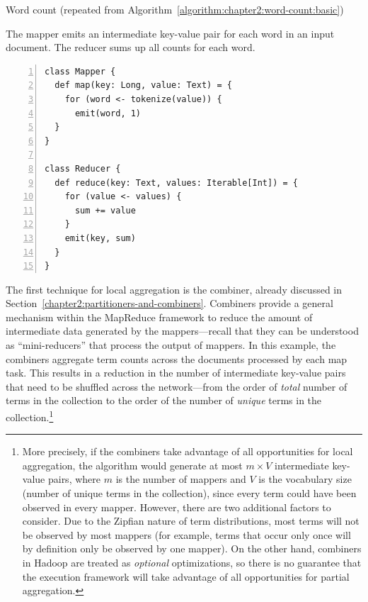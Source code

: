 \documentclass[11pt]{article}
\begin{document}
\begin{algorithm}[t]
\caption{Word count (repeated from Algorithm~\ref{algorithm:chapter2:word-count:basic})}
\label{algorithm:chapter3:word-count:basic}
The mapper emits an intermediate key-value pair for each word in an
input document. The reducer sums up all counts for each word.
\begin{small}
\begin{Verbatim}[numbers=left, xleftmargin=7.5mm]
class Mapper {
  def map(key: Long, value: Text) = {
    for (word <- tokenize(value)) {
      emit(word, 1)
  }
}

class Reducer {
  def reduce(key: Text, values: Iterable[Int]) = {
    for (value <- values) {
      sum += value
    }
    emit(key, sum)
  }
}
\end{Verbatim}
\end{small}
\end{algorithm}

The first technique for local aggregation is the combiner, already
discussed in Section~\ref{chapter2:partitioners-and-combiners}.
Combiners provide a general mechanism within the MapReduce framework
to reduce the amount of intermediate data generated by the
mappers---recall that they can be understood as ``mini-reducers'' that
process the output of mappers.  In this example, the combiners
aggregate term counts across the documents processed by each map task.
This results in a reduction in the number of intermediate key-value
pairs that need to be shuffled across the network---from the order of
\emph{total} number of terms in the collection to the order of the
number of \emph{unique} terms in the collection.\footnote{More
  precisely, if the combiners take advantage of all opportunities for
  local aggregation, the algorithm would generate at most $m \times V$
  intermediate key-value pairs, where $m$ is the number of mappers and
  $V$ is the vocabulary size (number of unique terms in the
  collection), since every term could have been observed in every
  mapper.  However, there are two additional factors to consider.  Due
  to the Zipfian nature of term distributions, most terms will not be
  observed by most mappers (for example, terms that occur only once
  will by definition only be observed by one mapper).  On the other
  hand, combiners in Hadoop are treated as \emph{optional}
  optimizations, so there is no guarantee that the execution framework
  will take advantage of all opportunities for partial aggregation.}
\end{document}
